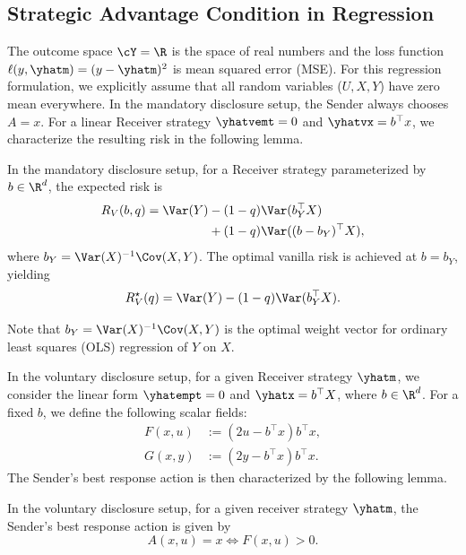 \subsection{Strategic Advantage Condition in Regression}
\label{sec:regression}

The outcome space $\cY = \R$ is the space of real numbers and the loss function $\ell(y, \yhatm) = (y - \yhatm)^2$ is mean squared error (MSE). For this regression formulation, we explicitly assume that all random variables ($U, X, Y$) have zero mean everywhere. In the mandatory disclosure setup, the Sender always chooses $A=x$. For a linear Receiver strategy $\yhatvemt = 0$ and $\yhatvx = b^\top x$, we characterize the resulting risk in the following lemma.

\begin{lemma} \label{lem:rv_regression} In the mandatory disclosure setup, for a Receiver strategy parameterized by $b \in \R^d$, the expected risk is
\begin{align}
R_V(b, q) = \Var(Y) & - (1-q) \Var(b_Y^\top X) \nonumber \\
& + (1-q)\Var((b-b_Y)^\top X), \label{eq:rv_b}
\end{align}
where $b_Y = \Var(X)^{-1}\Cov(X,Y)$. The optimal vanilla risk is achieved at $b = b_Y$, yielding
\begin{equation}
R_V^\star(q) = \Var(Y) - (1-q) \Var(b_Y^\top X).
\end{equation}
\end{lemma}

\begin{remark}
Note that $b_Y = \Var(X)^{-1}\Cov(X,Y)$ is the optimal weight vector for ordinary least squares (OLS) regression of $Y$ on $X$.
\end{remark}

In the voluntary disclosure setup, for a given Receiver strategy $\yhatm$, we consider the linear form $\yhatempt = 0$ and $\yhatx = b^\top X$, where $b \in \R^d$. For a fixed $b$, we define the following scalar fields:
\begin{align}
F(x,u) &:= (2u - b^\top x) b^\top x, \\
G(x,y) &:= (2y - b^\top x) b^\top x.
\end{align}
The Sender's best response action is then characterized by the following lemma.

\begin{lemma} \label{lem:sender_response}
  In the voluntary disclosure setup, for a given receiver strategy $\yhatm$, the Sender's best response action is given by
  \begin{equation}
    A(x,u) = x \iff F(x,u) > 0.
  \end{equation}
\end{lemma}

